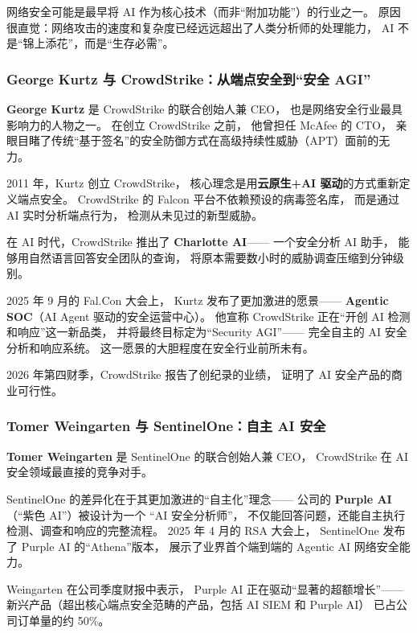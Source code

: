 网络安全可能是最早将 AI 作为核心技术（而非``附加功能''）的行业之一。
原因很直觉：网络攻击的速度和复杂度已经远远超出了人类分析师的处理能力，
AI 不是``锦上添花''，而是``生存必需''。

\subsubsection{George Kurtz 与 CrowdStrike：从端点安全到``安全 AGI''}

\textbf{George Kurtz} 是 CrowdStrike 的联合创始人兼 CEO，
也是网络安全行业最具影响力的人物之一。
在创立 CrowdStrike 之前，
他曾担任 McAfee 的 CTO，
亲眼目睹了传统``基于签名''的安全防御方式在高级持续性威胁（APT）面前的无力。

2011 年，Kurtz 创立 CrowdStrike，
核心理念是用\textbf{云原生+AI 驱动}的方式重新定义端点安全。
CrowdStrike 的 Falcon 平台不依赖预设的病毒签名库，
而是通过 AI 实时分析端点行为，
检测从未见过的新型威胁。

在 AI 时代，CrowdStrike 推出了 \textbf{Charlotte AI}——
一个安全分析 AI 助手，
能够用自然语言回答安全团队的查询，
将原本需要数小时的威胁调查压缩到分钟级别。

2025 年 9 月的 Fal.Con 大会上，
Kurtz 发布了更加激进的愿景——
\textbf{Agentic SOC}（AI Agent 驱动的安全运营中心）。
他宣称 CrowdStrike 正在``开创 AI 检测和响应''这一新品类，
并将最终目标定为``Security AGI''——
完全自主的 AI 安全分析和响应系统。
这一愿景的大胆程度在安全行业前所未有。

2026 年第四财季，CrowdStrike 报告了创纪录的业绩，
证明了 AI 安全产品的商业可行性。

\subsubsection{Tomer Weingarten 与 SentinelOne：自主 AI 安全}

\textbf{Tomer Weingarten} 是 SentinelOne 的联合创始人兼 CEO，
CrowdStrike 在 AI 安全领域最直接的竞争对手。

SentinelOne 的差异化在于其更加激进的``自主化''理念——
公司的 \textbf{Purple AI}（``紫色 AI''）被设计为一个
``AI 安全分析师''，
不仅能回答问题，还能自主执行检测、调查和响应的完整流程。
2025 年 4 月的 RSA 大会上，
SentinelOne 发布了 Purple AI 的``Athena''版本，
展示了业界首个端到端的 Agentic AI 网络安全能力。

Weingarten 在公司季度财报中表示，
Purple AI 正在驱动``显著的超额增长''——
新兴产品（超出核心端点安全范畴的产品，包括 AI SIEM 和 Purple AI）
已占公司订单量的约 50\%。


